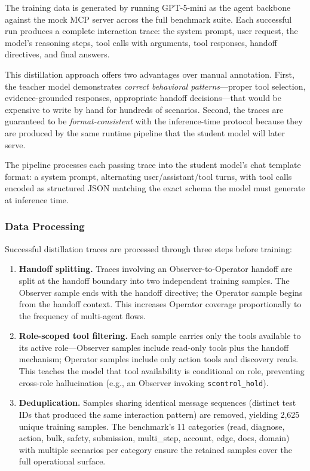 The training data is generated by running GPT-5-mini as the agent backbone against the mock MCP server across the full benchmark suite. Each successful run produces a complete interaction trace: the system prompt, user request, the model's reasoning steps, tool calls with arguments, tool responses, handoff directives, and final answers.

This distillation approach offers two advantages over manual annotation. First, the teacher model demonstrates \emph{correct behavioral patterns}---proper tool selection, evidence-grounded responses, appropriate handoff decisions---that would be expensive to write by hand for hundreds of scenarios. Second, the traces are guaranteed to be \emph{format-consistent} with the inference-time protocol because they are produced by the same runtime pipeline that the student model will later serve.

The pipeline processes each passing trace into the student model's chat template format: a system prompt, alternating user/assistant/tool turns, with tool calls encoded as structured JSON matching the exact schema the model must generate at inference time.

\subsubsection{Data Processing}

Successful distillation traces are processed through three steps before training:

\begin{enumerate}
    \item \textbf{Handoff splitting.} Traces involving an Observer-to-Operator handoff are split at the handoff boundary into two independent training samples. The Observer sample ends with the handoff directive; the Operator sample begins from the handoff context. This increases Operator coverage proportionally to the frequency of multi-agent flows.
    
    \item \textbf{Role-scoped tool filtering.} Each sample carries only the tools available to its active role---Observer samples include read-only tools plus the handoff mechanism; Operator samples include only action tools and discovery reads. This teaches the model that tool availability is conditional on role, preventing cross-role hallucination (e.g., an Observer invoking \texttt{scontrol\_hold}).
    
    \item \textbf{Deduplication.} Samples sharing identical message sequences (distinct test IDs that produced the same interaction pattern) are removed, yielding 2{,}625 unique training samples. The benchmark's 11 categories (read, diagnose, action, bulk, safety, submission, multi\_step, account, edge, docs, domain) with multiple scenarios per category ensure the retained samples cover the full operational surface.
\end{enumerate}

